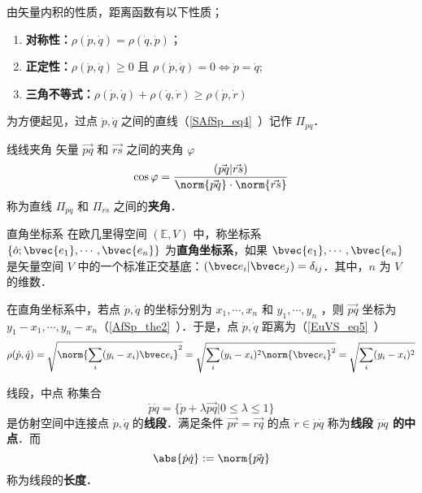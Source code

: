 由矢量内积的性质，距离函数有以下性质；
\begin{enumerate}
\item \textbf{对称性：}$\rho(\dot p,\dot q)=\rho(\dot q,\dot p)$；
\item \textbf{正定性：}$\rho(\dot p,\dot q)\geq 0$ 且 $\rho(\dot p,\dot q)= 0\Leftrightarrow\dot p=\dot q$;
\item \textbf{三角不等式：}$\rho(\dot p,\dot q)+\rho(\dot q,\dot r)\geq\rho(\dot p,\dot r)$
\end{enumerate}
为方便起见，过点 $\dot p,\dot q$ 之间的直线（\autoref{SAfSp_eq4}~）记作 $\Pi_{\dot p\dot q}$．
\begin{definition}{线线夹角}
矢量 $\vec{pq}$ 和 $\vec{rs}$ 之间的夹角 $\varphi$
\begin{equation}
\cos\varphi=\frac{(\vec{pq}|\vec{rs})}{\norm{\vec{pq}}\cdot\norm{\vec{rs}}}
\end{equation}
称为直线 $\Pi_{\dot p\dot q}$ 和 $\Pi_{\dot r\dot s}$ 之间的\textbf{夹角}．
\end{definition}
\begin{definition}{直角坐标系}
在欧几里得空间 $(\mathbb E,V)$ 中，称坐标系 $\{\dot o;\bvec{e_1},\cdots,\bvec{e_n}\}$ 为\textbf{直角坐标系}，如果 $\bvec{e_1},\cdots,\bvec{e_n}$ 是矢量空间 $V$ 中的一个标准正交基底：$(\bvec e_i|\bvec e_j)=\delta_{ij}$．其中，$n$ 为 $V$ 的维数．
\end{definition}
\begin{example}{}
在直角坐标系中，若点 $\dot p,\dot q$ 的坐标分别为 $x_1,\cdots,x_n$ 和 $y_1,\cdots,y_n$ ，则 $\vec{pq}$ 坐标为 $y_1-x_1,\cdots,y_n-x_n$（\autoref{AfSp_the2}~）．于是，点 $\dot p,\dot q$ 距离为（\autoref{EuVS_eq5}~）
\begin{equation}
\rho(\dot p,\dot q)=\sqrt{\norm{\sum_{i}(y_i-x_i)\bvec e_i}^2}=\sqrt{\sum_{i}(y_i-x_i)^2\norm{\bvec e_i}^2}=\sqrt{\sum_{i}(y_i-x_i)^2}
\end{equation}
\end{example}
\begin{definition}{线段，中点}
称集合
\begin{equation}
\dot p\dot q=\{\dot p+\lambda\vec{pq}|0\leq\lambda\leq1\}
\end{equation}
是仿射空间中连接点 $\dot p,\dot q$ 的\textbf{线段}．满足条件 $\vec{pr}=\vec{rq}$ 的点 $\dot r\in\dot p\dot q$ 称为\textbf{线段 $\dot p\dot q$ 的中点}．而
\begin{equation}
\abs{\dot p\dot q}:=\norm{\vec{pq}}
\end{equation}
称为线段的\textbf{长度}．
\end{definition}
